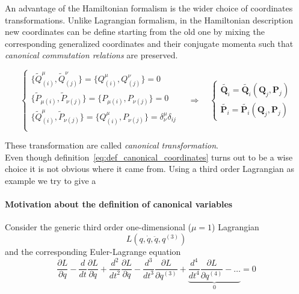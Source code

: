 An advantage of the Hamiltonian formalism is the wider choice of coordinates
transformations. Unlike Lagrangian formalism, in the Hamiltonian description new
coordinates can be define starting from the old one by mixing the corresponding
generalized coordinates and their conjugate momenta such that \emph{canonical
commutation relations} are preserved.

\begin{equation} \label{eq:canonical_transformation}
  \begin{cases}
    \{\tilde{Q}^{\mu}_{(i)}, \tilde{Q}^{\nu}_{(j)}\} =
    \{Q^{\mu}_{(i)}, Q^{\nu}_{(j)}\} = 0 \\
    \{\tilde{P}_{\mu(i)}, \tilde{P}_{\nu(j)}\} =
    \{P_{\mu(i)}, P_{\nu(j)}\} = 0 \\
    \{\tilde{Q}^{\mu}_{(i)}, \tilde{P}_{\nu(j)}\} =
    \{Q^{\mu}_{(i)}, P_{\nu(j)}\} = \delta^{\mu}_{\nu} \delta_{ij}\\
  \end{cases}
  \quad \Rightarrow \quad
  \begin{cases}
    \tilde{\bm{Q}_i} = \tilde{\bm{Q}_i}(\bm{Q}_j, \bm{P}_j) \\
    \tilde{\bm{P}_i} = \tilde{\bm{P}_i}(\bm{Q}_j, \bm{P}_j)
  \end{cases}
\end{equation}

These transformation are called \emph{canonical transformation}.\\

Even though definition~\eqref{eq:def_canonical_coordinates} turns out to be a
wise choice it is not obvious where it came from. Using a third order
Lagrangian as example we try to give a
\paragraph{Motivation about the definition of canonical variables}
Consider the generic third order one-dimensional ($\mu=1$) Lagrangian
\begin{equation*}
  L\left( q, \dot{q}, \ddot{q}, q^{(3)} \right)
\end{equation*}
and the corresponding Euler-Lagrange equation
\begin{equation} \label{eq:third_order_euler_lagrangian}
  \frac{\partial L}{\partial q} -
  \frac{d}{dt}\frac{\partial L}{\partial \dot{q}} +
  \frac{d^2}{dt^2}\frac{\partial L}{\partial \ddot{q}} -
  \frac{d^3}{dt^3}\frac{\partial L}{\partial q^{(3)}} +
  \underbrace{
  \frac{d^4}{dt^4}\frac{\partial L}{\partial q^{(4)}} - \ldots }_0 = 0
\end{equation}

